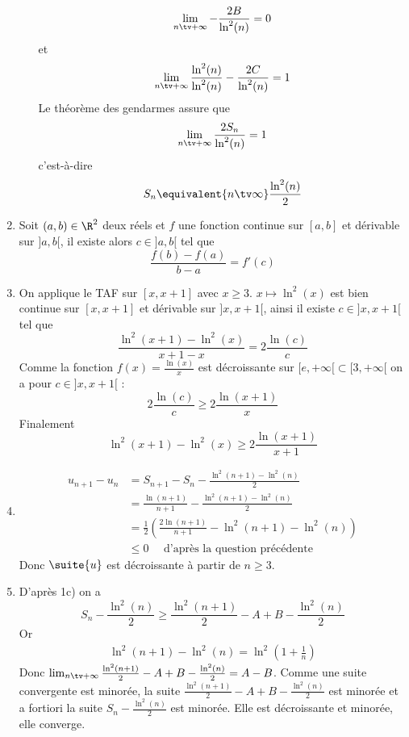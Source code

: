 \begin{correction}
\begin{enumerate}
\begin{enumerate}
$$\lim_{n\tv +\infty}-\frac{2B}{\ln^2(n)} = 0$$
et
$$\lim_{n\tv +\infty} \frac{\ln^2(n)}{\ln^2(n)} -\frac{2C}{\ln^2(n)}= 1$$
Le théorème des gendarmes assure que 
$$\lim_{n\tv +\infty}  \frac{2S_n}{\ln^2(n)}=1$$
c'est-à-dire $$S_n  \equivalent{n\tv \infty} \frac{\ln^2(n)}{2}$$
\end{enumerate}
\item Soit $(a,b) \in \R^2$ deux réels et $f $ une fonction continue sur $[a,b]$ et dérivable sur $]a, b[$, il existe alors $c\in ]a, b[$ tel que 
$$\frac{f(b)-f(a)}{b-a} =f'(c)$$
\item On applique le TAF sur $[x,x+1]$ avec $x\geq 3$. $x\mapsto \ln^2(x)$ est bien continue sur $[x,x+1]$ et dérivable sur $]x, x+1[$, ainsi il existe $c\in ]x, x+1[$ tel que 
$$\frac{\ln^2(x+1)-\ln^2(x)}{x+1-x} =2\frac{\ln(c)}{c}$$
Comme la fonction $f(x) =\frac{\ln(x)}{x}$ est décroissante sur $[e, +\infty[\subset [3, +\infty[$ on a pour $c\in ]x,x+1[$ :
$$2\frac{\ln(c)}{c} \geq 2\frac{\ln(x+1)}{x}$$
Finalement 
$$\ln^2(x+1)-\ln^2(x) \geq 2\frac{\ln(x+1)}{x+1}$$
\item
\begin{align*}
 u_{n+1}-u_n &= S_{n+1} -S_n -\frac{\ln^2(n+1)-\ln^2(n)}{2}\\
 					&= \frac{\ln(n+1)}{n+1}- \frac{\ln^2(n+1)-\ln^2(n)}{2}\\
 					&= \frac{1}{2} \left(  \frac{2\ln(n+1)}{n+1}- \ln^2(n+1)-\ln^2(n)  \right)\\
 					&\leq 0\quad \text{ d'après la question précédente}
\end{align*}
Donc $\suite{u}$ est décroissante à partir de $n\geq 3$. 
\item D'après 1c) on  a
$$S_n -\frac{\ln^2(n)}{2 }\geq \frac{\ln^2(n+1) }{2} - A +B -\frac{\ln^2(n)}{2 }$$
Or 
\begin{align*}
\ln^2(n+1)-\ln^2(n) =\ln^2\left(1+\frac{1}{n}\right)
\end{align*}
Donc $\lim_{n\tv +\infty }  \frac{\ln^2(n+1) }{2} - A +B -\frac{\ln^2(n)}{2 } = A-B$. Comme une suite convergente est minorée, la suite $ \frac{\ln^2(n+1) }{2} - A +B -\frac{\ln^2(n)}{2 }$ est minorée et a fortiori la suite $S_n -\frac{\ln^2(n)}{2 }$ est minorée. Elle est décroissante et minorée, elle converge. 


\end{enumerate}
\end{correction}